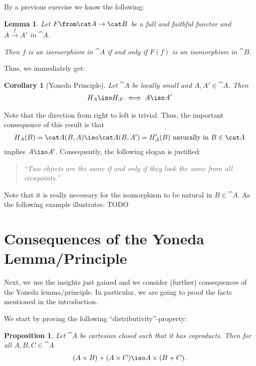 \documentclass{article}
\newtheorem{lemma}{Lemma}
\newtheorem{proposition}{Proposition}
\newtheorem{corollary}{Corollary}
\begin{document}
By a previous exercise we know the following:
\begin{lemma}
  Let $F\from\cat A\to\cat B$ be a full and faithful functor and $A\xrightarrow{f} A'$ in $\cat A$.

  Then $f$ is an isomorphism in $\cat A$ if and only if $F(f)$ is an isomorphism in $\cat B$.
\end{lemma}
Thus, we immediately get:
\begin{corollary}[Yoneda Principle]
  Let $\cat A$ be locally small and $A,A'\in\cat A$. Then
  \begin{align*}
    H_A\iso H_{A'} \iff A\iso A'
  \end{align*}
\end{corollary}
Note that the direction from right to left is trivial. Thus, the important consequence of this result is that
\begin{align*}
  H_A(B)=\cat A(B,A)\iso \cat  A(B,A')=H_A'(B) \text{ naturally in } B\in\cat A
\end{align*}
implies $A\iso A'$. Consequently, the following slogan is justified:
\begin{quote}
  \textit{``Two objects are the same if and only if they look the same from all viewpoints.''}
\end{quote}
Note that it is really necessary for the isomorphism to be natural in $B\in\cat A$. As the following example illustrates:
TODO
\section{Consequences of the Yoneda Lemma/Principle}
Next, we use the insights just gained and we consider (further) consequences of the Yoneda lemma/principle. In particular, we are going to proof the facts mentioned in the introduction.

We start by proving the following ``distributivity''-property:

\begin{proposition}
  \label{prop:dis}
  Let $\cat A$ be cartesian closed such that it has coproducts. Then for all $A,B,C\in\cat A$
  \begin{align*}
    (A\times B)+(A\times C)\iso A\times (B+C).
  \end{align*}
\end{proposition}
\end{document}
